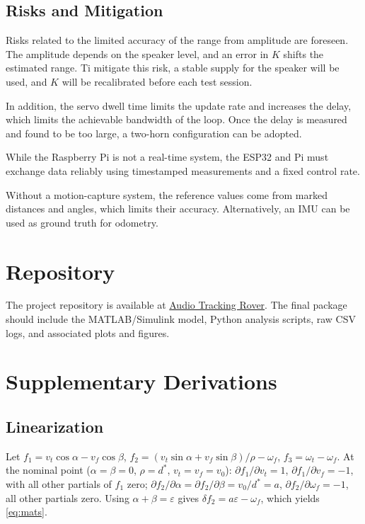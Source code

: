 \documentclass[journal,a4paper]{IEEEtran}
\begin{document}
\subsection{Risks and Mitigation}
Risks related to the limited accuracy of the range from amplitude are foreseen. The amplitude depends on the speaker level, and an error in $K$ shifts the estimated range. Ti mitigate this risk, a stable supply for the speaker will be used, and $K$ will be recalibrated before each test session.

In addition, the servo dwell time limits the update rate and increases the delay, which limits the achievable bandwidth of the loop. Once the delay is measured and found to be too large, a two-horn configuration can be adopted.

While the Raspberry Pi is not a real-time system, the ESP32 and Pi must exchange data reliably using timestamped measurements and a fixed control rate.

Without a motion-capture system, the reference values come from marked distances and angles, which limits their accuracy. Alternatively, an IMU can be used as ground truth for odometry. 




\appendices
\section{Repository}
The project repository is available at \href{https://github.com/helenejabbour/Audio-Tracking-Rover}{Audio Tracking Rover}. The final package should include the MATLAB/Simulink model, Python analysis scripts, raw CSV logs, and associated plots and figures.

\section{Supplementary Derivations}
\label{app:der}

\subsection{Linearization}
Let $f_1=v_t\cos\alpha-v_f\cos\beta$, $f_2=(v_t\sin\alpha+v_f\sin\beta)/\rho-\omega_f$, $f_3=\omega_t-\omega_f$. At the nominal point ($\alpha=\beta=0$, $\rho=d^\ast$, $v_t=v_f=v_0$): $\partial f_1/\partial v_t=1$, $\partial f_1/\partial v_f=-1$, with all other partials of $f_1$ zero; $\partial f_2/\partial\alpha=\partial f_2/\partial\beta=v_0/d^\ast=a$, $\partial f_2/\partial\omega_f=-1$, all other partials zero. Using $\alpha+\beta=\varepsilon$ gives $\delta f_2=a\varepsilon-\omega_f$, which yields \eqref{eq:mats}.
\end{document}
